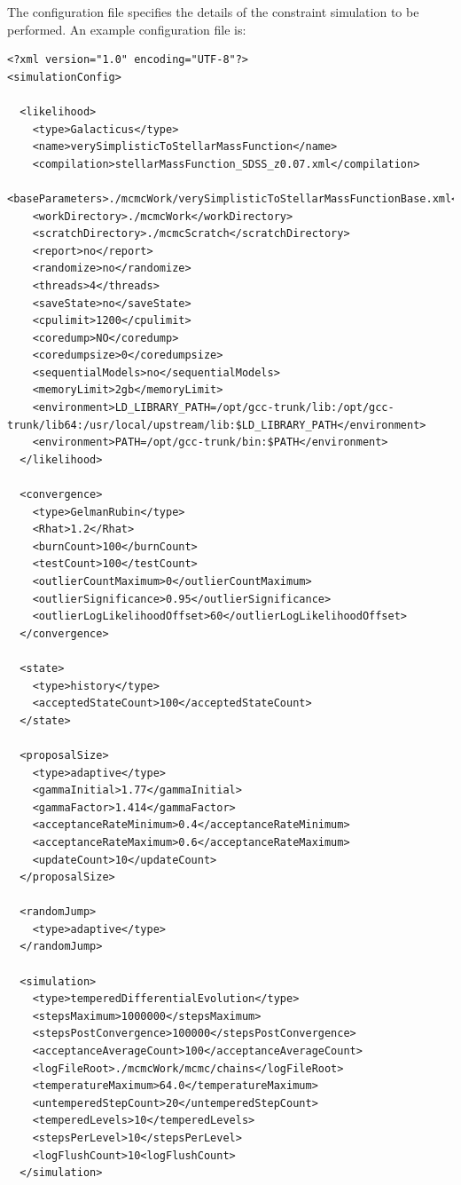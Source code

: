 The configuration file specifies the details of the constraint simulation to be performed. An example configuration file is:
\begin{verbatim}
<?xml version="1.0" encoding="UTF-8"?>
<simulationConfig>

  <likelihood>
    <type>Galacticus</type>
    <name>verySimplisticToStellarMassFunction</name>
    <compilation>stellarMassFunction_SDSS_z0.07.xml</compilation>
    <baseParameters>./mcmcWork/verySimplisticToStellarMassFunctionBase.xml</baseParameters>
    <workDirectory>./mcmcWork</workDirectory>
    <scratchDirectory>./mcmcScratch</scratchDirectory>
    <report>no</report>
    <randomize>no</randomize>
    <threads>4</threads>
    <saveState>no</saveState>
    <cpulimit>1200</cpulimit>
    <coredump>NO</coredump>
    <coredumpsize>0</coredumpsize>
    <sequentialModels>no</sequentialModels>
    <memoryLimit>2gb</memoryLimit>
    <environment>LD_LIBRARY_PATH=/opt/gcc-trunk/lib:/opt/gcc-trunk/lib64:/usr/local/upstream/lib:$LD_LIBRARY_PATH</environment>
    <environment>PATH=/opt/gcc-trunk/bin:$PATH</environment>
  </likelihood>

  <convergence>
    <type>GelmanRubin</type>
    <Rhat>1.2</Rhat>
    <burnCount>100</burnCount>
    <testCount>100</testCount>
    <outlierCountMaximum>0</outlierCountMaximum>
    <outlierSignificance>0.95</outlierSignificance>
    <outlierLogLikelihoodOffset>60</outlierLogLikelihoodOffset>
  </convergence>
  
  <state>
    <type>history</type>
    <acceptedStateCount>100</acceptedStateCount>
  </state>
  
  <proposalSize>
    <type>adaptive</type>
    <gammaInitial>1.77</gammaInitial>
    <gammaFactor>1.414</gammaFactor>
    <acceptanceRateMinimum>0.4</acceptanceRateMinimum>
    <acceptanceRateMaximum>0.6</acceptanceRateMaximum>
    <updateCount>10</updateCount>
  </proposalSize>
  
  <randomJump>
    <type>adaptive</type>
  </randomJump>
  
  <simulation>
    <type>temperedDifferentialEvolution</type>
    <stepsMaximum>1000000</stepsMaximum>
    <stepsPostConvergence>100000</stepsPostConvergence>
    <acceptanceAverageCount>100</acceptanceAverageCount>
    <logFileRoot>./mcmcWork/mcmc/chains</logFileRoot>
    <temperatureMaximum>64.0</temperatureMaximum>
    <untemperedStepCount>20</untemperedStepCount>
    <temperedLevels>10</temperedLevels>
    <stepsPerLevel>10</stepsPerLevel>
    <logFlushCount>10<logFlushCount>
  </simulation>


\end{verbatim}
